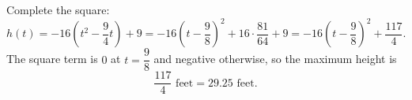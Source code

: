 Complete the square:
\[
h(t)=-16\left(t^2-\dfrac{9}{4}t\right)+9=-16\left(t-\dfrac{9}{8}\right)^2+16\cdot\dfrac{81}{64}+9=-16\left(t-\dfrac{9}{8}\right)^2+\dfrac{117}{4}.
\]
The square term is \(0\) at \(t=\dfrac{9}{8}\) and negative otherwise, so the maximum height is
\[
\boxed{\dfrac{117}{4}\text{ feet}}=29.25\text{ feet}.
\]
